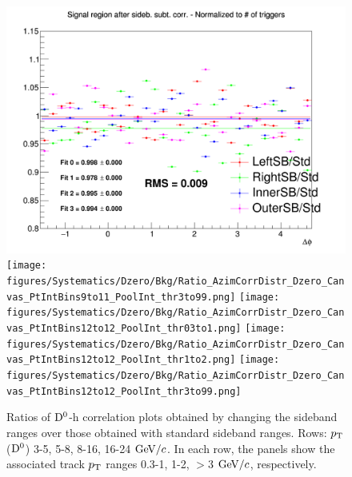 \begin{figure}
{\includegraphics[width=0.31\linewidth]{figures/Systematics/Dzero/Bkg/Ratio_AzimCorrDistr_Dzero_Canvas_PtIntBins9to11_PoolInt_thr1to2.png}}
{\texttt{[image: figures/Systematics/Dzero/Bkg/Ratio\_AzimCorrDistr\_Dzero\_Canvas\_PtIntBins9to11\_PoolInt\_thr3to99.png]}}
{\texttt{[image: figures/Systematics/Dzero/Bkg/Ratio\_AzimCorrDistr\_Dzero\_Canvas\_PtIntBins12to12\_PoolInt\_thr03to1.png]}}
{\texttt{[image: figures/Systematics/Dzero/Bkg/Ratio\_AzimCorrDistr\_Dzero\_Canvas\_PtIntBins12to12\_PoolInt\_thr1to2.png]}}
{\texttt{[image: figures/Systematics/Dzero/Bkg/Ratio\_AzimCorrDistr\_Dzero\_Canvas\_PtIntBins12to12\_PoolInt\_thr3to99.png]}}
 \caption{Ratios of ${\rm D^0}$-h correlation plots obtained by changing the sideband ranges over those obtained with standard sideband ranges. Rows: $p_{\rm T}$(${\rm D^0}$) 3-5, 5-8, 8-16, 16-24 $\mathrm{GeV}/c$. In each row, the panels show the associated track $p_{\rm T}$ ranges 0.3-1, 1-2, $>$3 $\mathrm{GeV}/c$, respectively.}
\label{fig:Syst_D0Bkg}
\end{figure}

